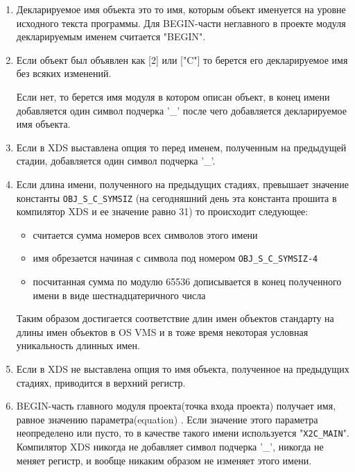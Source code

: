 \begin{enumerate}
\item Декларируемое имя объекта это то имя, которым объект именуется на 
     уровне исходного текста программы. Для BEGIN-части неглавного в 
     проекте модуля декларируемым именем считается "BEGIN".

\item Если объект был объявлен как [2] или ["C"] то берется его 
     декларируемое имя без всяких изменений.

       Если нет, то берется имя модуля в котором описан объект, в конец
     имени добавляется один символ подчерка '\_' после чего добавляется
     декларируемое имя объекта.
       
\item Если в XDS выставлена опция  то перед именем, полученным
     на предыдущей стадии, добавляется один символ подчерка '\_'.

\item Если длина имени, полученного на предыдущих стадиях, превышает
     значение константы \verb'OBJ_S_C_SYMSIZ' (на сегодняшний день эта 
     константа прошита в компилятор XDS и ее значение равно 31)
     то происходит следующее:
     \begin{itemize}
     \item считается сумма номеров всех символов этого имени
     \item имя обрезается начиная с символа под номером \verb'OBJ_S_C_SYMSIZ-4'
     \item посчитанная сумма по модулю 65536 дописывается в конец
         полученного имени в виде шестнадцатеричного числа
     \end{itemize}
     Таким образом достигается соответствие длин имен объектов стандарту
     на длины имен объектов в OS VMS и в тоже время некоторая условная
     уникальность длинных имен.

\item Если в XDS не выставлена опция  то имя объекта,
     полученное на предыдущих стадиях, приводится в верхний регистр.

\item BEGIN-часть главного модуля проекта(точка входа проекта) получает
     имя, равное значению параметра(equation) . Если значение
     этого параметра неопределено или пусто, то в качестве такого имени
     используется "\verb'X2C_MAIN'". Компилятор XDS никогда не добавляет
     символ подчерка '\_', никогда не меняет регистр, и вообще никаким
     образом не изменяет этого имени.
\end{enumerate}

